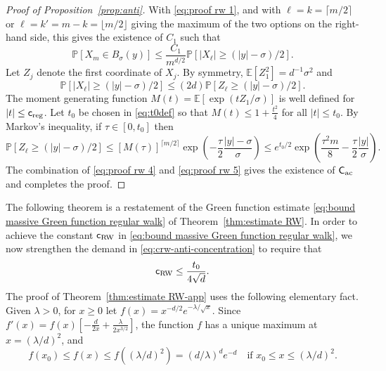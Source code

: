 \documentclass[11pt,a4paper]{article}
\numberwithin{equation}{section}
\theoremstyle{plain}
\theoremstyle{definition}
\newcommand\1{\mathds{1}}
\newcommand\crw{\mathsf{c}_{\textup{RW}}}
\newcommand\cM{\mathsf{c}_{\textup{reg}}}
\newcommand{\CAC}{\mathsf C_{\textup{ac}}}
\begin{document}
\begin{proof}[Proof of Proposition~\textup{\ref{prop:anti}}]
With \eqref{eq:proof rw 1}, and with $\ell=k=\lceil m/2 \rceil$ or $\ell =k' = m-k=
\lfloor m/2 \rfloor$ giving the
maximum of the two options on the right-hand side, this gives
the existence of $C_1$ such that
\begin{equation}
\label{eq:proof rw 4}
	\mathbb P[X_m \in B_\sigma(y)]
    \leq
    \frac{C_1}{m^{d/2}}\mathbb P[|X_{\ell}|\geq (|y|-\sigma)/2].
\end{equation}
Let $Z_j$ denote the first coordinate of $X_j$.
By symmetry, $\mathbb E[Z_1^2]=d^{-1}\sigma^2$ and
\begin{equation}
\label{eq: proof consequence regularity 1}
	\mathbb P[|X_{\ell}|\geq (|y|-\sigma)/2]
    \leq (2d) \mathbb P[Z_{\ell} \geq (|y|-\sigma)/2].
\end{equation}
The moment generating function $M(t)=\mathbb E[\exp(tZ_1/\sigma)]$ is well defined for $|t|\leq\cM$.
Let $t_0$ be chosen in \eqref{eq:t0def} so that
$M(t)\leq 1+\frac{t^2}{4}$ for all $|t|\leq t_0$.
By Markov's inequality, if $\tau \in [0,t_0]$ then
\begin{equation}
\label{eq:proof rw 5}
	\mathbb P[Z_{\ell}\geq (|y|-\sigma)/2]
    \leq [M(\tau)]^{\lceil m/2 \rceil}\exp\left(-\frac{\tau}{2}\frac{|y|-\sigma}{\sigma }\right)
    \le e^{t_0/2}\exp\left(\frac{\tau^2 m}{8} -\frac{\tau}{2}\frac{|y|}{\sigma }\right).
\end{equation}
The combination of
\eqref{eq:proof rw 4} and \eqref{eq:proof rw 5}
gives the existence of $\CAC$ and completes the proof.
\end{proof}

The following theorem is a restatement of the Green function
estimate \eqref{eq:bound massive Green function regular walk} of Theorem~\ref{thm:estimate RW}. In order to achieve the constant $\crw$ in \eqref{eq:bound massive Green function regular walk},
we now strengthen the demand in \eqref{eq:crw-anti-concentration} to require that
\begin{equation}
    \crw \le \frac{t_0}{4\sqrt{d}}.
\end{equation}
The proof of Theorem~\ref{thm:estimate RW-app}
uses the following elementary fact.
Given $\lambda >0$, for $x \ge 0$ let   $f(x)=x^{-d/2}e^{-\lambda/\sqrt{x}}$.
Since $f'(x)=f(x)[-\frac{d}{2x}+ \frac{\lambda}{2x^{3/2}}]$, the function
$f$ has a unique maximum at $x=(\lambda/d)^2$, and
\begin{equation}
\label{eq:fmax}
    f(x_0)
    \le f(x) \le f((\lambda/d)^2)=(d/\lambda)^de^{-d}  \quad \text{if $x_0\leq x\le (\lambda/d)^2$.}
\end{equation}
\end{document}
